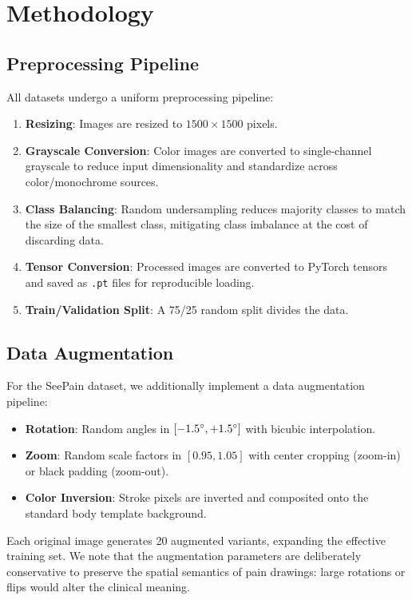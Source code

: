 \documentclass[conference]{IEEEtran}
\begin{document}
\section{Methodology}
\label{sec:methodology}

\subsection{Preprocessing Pipeline}

All datasets undergo a uniform preprocessing pipeline:
\begin{enumerate}
    \item \textbf{Resizing}: Images are resized to $1500 \times 1500$ pixels.
    \item \textbf{Grayscale Conversion}: Color images are converted to single-channel grayscale to reduce input dimensionality and standardize across color/monochrome sources.
    \item \textbf{Class Balancing}: Random undersampling reduces majority classes to match the size of the smallest class, mitigating class imbalance at the cost of discarding data.
    \item \textbf{Tensor Conversion}: Processed images are converted to PyTorch tensors and saved as \texttt{.pt} files for reproducible loading.
    \item \textbf{Train/Validation Split}: A 75/25 random split divides the data.
\end{enumerate}

\subsection{Data Augmentation}

For the SeePain dataset, we additionally implement a data augmentation pipeline:
\begin{itemize}
    \item \textbf{Rotation}: Random angles in $[-1.5\degree, +1.5\degree]$ with bicubic interpolation.
    \item \textbf{Zoom}: Random scale factors in $[0.95, 1.05]$ with center cropping (zoom-in) or black padding (zoom-out).
    \item \textbf{Color Inversion}: Stroke pixels are inverted and composited onto the standard body template background.
\end{itemize}
Each original image generates 20 augmented variants, expanding the effective training set. We note that the augmentation parameters are deliberately conservative to preserve the spatial semantics of pain drawings: large rotations or flips would alter the clinical meaning.
\end{document}
